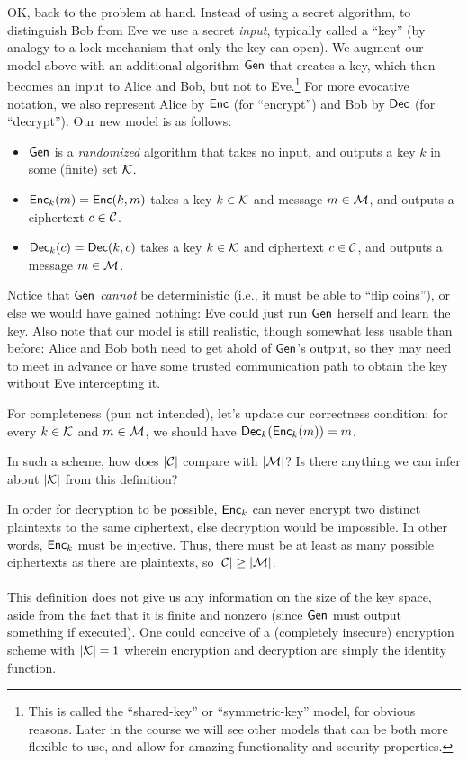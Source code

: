 \documentclass[11pt]{article}
\begin{document}
OK, back to the problem at hand.  Instead of using a secret algorithm,
to distinguish Bob from Eve we use a secret \emph{input}, typically
called a ``key'' (by analogy to a lock mechanism that only the key can
open).  We augment our model above with an additional algorithm
$\mathsf{Gen}$ that creates a key, which then becomes an input to Alice and
Bob, but not to Eve.\footnote{This is called the ``shared-key'' or
  ``symmetric-key'' model, for obvious reasons.  Later in the course
  we will see other models that can be both more flexible to use, and
  allow for amazing functionality and security properties.} For more
evocative notation, we also represent Alice by $\mathsf{Enc}$ (for
``encrypt'') and Bob by $\mathsf{Dec}$ (for ``decrypt'').  Our new model is
as follows:
\begin{itemize}
\item $\mathsf{Gen}$ is a \emph{randomized} algorithm that takes no input,
  and outputs a key $k$ in some (finite) set $\mathcal{K}$.
\item $\mathsf{Enc}_{k}(m) = \mathsf{Enc}(k,m)$ takes a key $k \in \mathcal{K}$
  and message $m \in \mathcal{M}$, and outputs a ciphertext $c \in
  \mathcal{C}$.
\item $\mathsf{Dec}_{k}(c) = \mathsf{Dec}(k,c)$ takes a key $k \in \mathcal{K}$
  and ciphertext $c \in \mathcal{C}$, and outputs a message $m \in
  \mathcal{M}$.
\end{itemize}
Notice that $\mathsf{Gen}$ \emph{cannot} be deterministic (i.e., it must be
able to ``flip coins''), or else we would have gained nothing: Eve
could just run $\mathsf{Gen}$ herself and learn the key.  Also note that
our model is still realistic, though somewhat less usable than before:
Alice and Bob both need to get ahold of $\mathsf{Gen}$'s output, so they
may need to meet in advance or have some trusted communication path to
obtain the key without Eve intercepting it.

For completeness (pun not intended), let's update our correctness
condition: for every $k \in \mathcal{K}$ and $m \in \mathcal{M}$, we
should have $\mathsf{Dec}_{k}(\mathsf{Enc}_{k}(m)) = m$.

\begin{question}
    In such a scheme, how does \(\lvert\mathcal{C}\rvert\) compare with \(\lvert\mathcal{M}\rvert\)? Is
    there anything we can infer about \(\lvert\mathcal{K}\rvert\) from this definition?
\end{question}
\begin{answer}
    In order for decryption to be possible, \(\mathsf{Enc}_k\) can never encrypt two distinct
    plaintexts to the same ciphertext, else decryption would be impossible. In other
    words, \(\mathsf{Enc}_k\) must be injective. Thus, there must be at least as many
    possible ciphertexts as there are plaintexts, so \(\lvert\mathcal{C}\rvert \geq
    \lvert\mathcal{M}\rvert\).\\\\
    This definition does not give us any information on the size of the key space, aside
    from the fact that it is finite and nonzero (since \(\mathsf{Gen}\) must output
    something if executed). One could conceive of a (completely insecure) encryption
    scheme with \(\lvert\mathcal{K}\rvert = 1\) wherein encryption and decryption
    are simply the identity function.
\end{answer}
\end{document}
